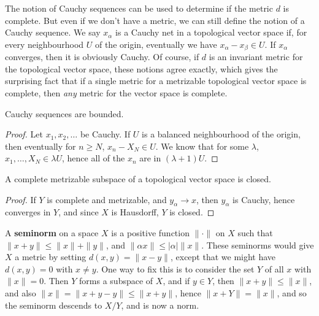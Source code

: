 The notion of Cauchy sequences can be used to determine if the metric $d$ is complete. But even if we don't have a metric, we can still define the notion of a Cauchy sequence. We say $x_\alpha$ is a Cauchy net in a topological vector space if, for every neighbourhood $U$ of the origin, eventually we have $x_\alpha - x_\beta \in U$. If $x_\alpha$ converges, then it is obviously Cauchy. Of course, if $d$ is an invariant metric for the topological vector space, these notions agree exactly, which gives the surprising fact that if a single metric for a metrizable topological vector space is complete, then {\it any} metric for the vector space is complete.

\begin{theorem}
    Cauchy sequences are bounded.
\end{theorem}
\begin{proof}
    Let $x_1, x_2, \dots$ be Cauchy. If $U$ is a balanced neighbourhood of the origin, then eventually for $n \geq N$, $x_n - X_N \in U$. We know that for some $\lambda$, $x_1, \dots, X_N \in \lambda U$, hence all of the $x_n$ are in $(\lambda + 1)U$.
\end{proof}

\begin{theorem}
    A complete metrizable subspace of a topological vector space is closed.
\end{theorem}
\begin{proof}
    If $Y$ is complete and metrizable, and $y_\alpha \to x$, then $y_\alpha$ is Cauchy, hence converges in $Y$, and since $X$ is Hausdorff, $Y$ is closed.
\end{proof}

A {\bf seminorm} on a space $X$ is a positive function $\| \cdot \|$ on $X$ such that $\| x + y \| \leq \| x \| + \| y \|$, and $\| \alpha x \| \leq |\alpha| \| x \|$. These seminorms would give $X$ a metric by setting $d(x,y) = \| x - y \|$, except that we might have $d(x,y) = 0$ with $x \neq y$. One way to fix this is to consider the set $Y$ of all $x$ with $\| x \| = 0$. Then $Y$ forms a subspace of $X$, and if $y \in Y$, then $\| x + y \| \leq \| x \|$, and also $\| x \| = \| x + y - y \| \leq \| x + y \|$, hence $\| x + Y \| = \| x \|$, and so the seminorm descends to $X/Y$, and is now a norm.

